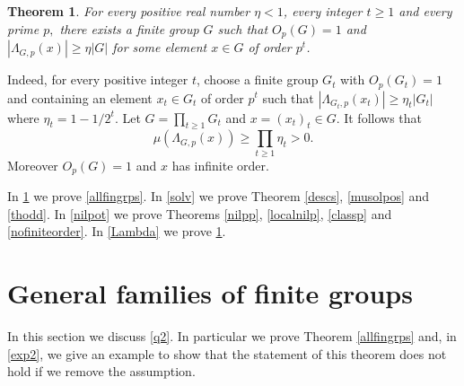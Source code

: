 \documentclass{amsart}
\newtheorem{thm}{Theorem}
\numberwithin{equation}{section}
\begin{document}
\begin{thm}\label{nobaer}
For every positive real number $\eta<1$, every integer $t \geq 1$
and every prime $p,$ there exists a finite group $G$ such that $O_p(G)=1$ and
$|\Lambda_{G,p}(x)|\geq \eta|G|$ for some element $x \in G$ of order $p^t$.
\end{thm}

Indeed, for every positive integer $t$, choose a finite group $G_t$ with $O_p(G_t)=1$ and containing an element $x_t \in G_t$ of order $p^t$ such that $|\Lambda_{G_t,p}(x_t)| \geq \eta_t |G_t|$ where $\eta_t = 1-1/2^t$. Let $G =\prod_{t \geq 1} G_t$ and $x=(x_t)_t \in G$. It follows that
\[\mu(\Lambda_{G,p}(x)) \geq \prod_{t \geq 1} \eta_t > 0.\]
Moreover $O_p(G)=1$ and $x$ has infinite order.

In \cref{families} we prove \cref{allfingrps}. In \cref{solv} we prove Theorem \ref{descs}, \ref{musolpos} and \ref{thodd}. In \cref{nilpot} we prove Theorems  \ref{nilpp}, \ref{localnilp}, \ref{classp} and \ref{nofiniteorder}. In \cref{Lambda} we prove \cref{nobaer}.

\section{General families of finite groups} \label{families}

In this section we discuss \cref{q2}. In particular we prove Theorem \ref{allfingrps} and, in \cref{exp2}, we give an example to show that the statement of this theorem does not hold if we remove the assumption.
\end{document}
